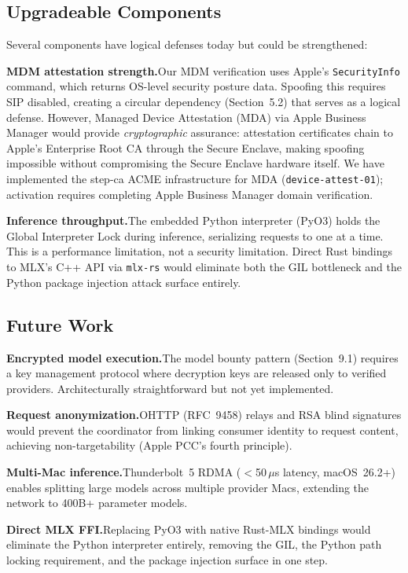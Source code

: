 \documentclass[10pt,twocolumn,letterpaper]{article}
\begin{document}
\subsection{Upgradeable Components}

Several components have logical defenses today but could be strengthened:

\textbf{MDM attestation strength.}\quad Our MDM verification uses Apple's \texttt{SecurityInfo} command, which returns OS-level security posture data. Spoofing this requires SIP disabled, creating a circular dependency (Section~5.2) that serves as a logical defense. However, Managed Device Attestation (MDA) via Apple Business Manager would provide \emph{cryptographic} assurance: attestation certificates chain to Apple's Enterprise Root CA through the Secure Enclave, making spoofing impossible without compromising the Secure Enclave hardware itself. We have implemented the step-ca ACME infrastructure for MDA (\texttt{device-attest-01}); activation requires completing Apple Business Manager domain verification.

\textbf{Inference throughput.}\quad The embedded Python interpreter (PyO3) holds the Global Interpreter Lock during inference, serializing requests to one at a time. This is a performance limitation, not a security limitation. Direct Rust bindings to MLX's C++ API via \texttt{mlx-rs} would eliminate both the GIL bottleneck and the Python package injection attack surface entirely.

\subsection{Future Work}

\textbf{Encrypted model execution.}\quad The model bounty pattern (Section~9.1) requires a key management protocol where decryption keys are released only to verified providers. Architecturally straightforward but not yet implemented.

\textbf{Request anonymization.}\quad OHTTP (RFC~9458) relays and RSA blind signatures would prevent the coordinator from linking consumer identity to request content, achieving non-targetability (Apple PCC's fourth principle).

\textbf{Multi-Mac inference.}\quad Thunderbolt~5 RDMA ($<$50\,$\mu$s latency, macOS~26.2+) enables splitting large models across multiple provider Macs, extending the network to 400B+ parameter models.

\textbf{Direct MLX FFI.}\quad Replacing PyO3 with native Rust-MLX bindings would eliminate the Python interpreter entirely, removing the GIL, the Python path locking requirement, and the package injection surface in one step.
\end{document}
